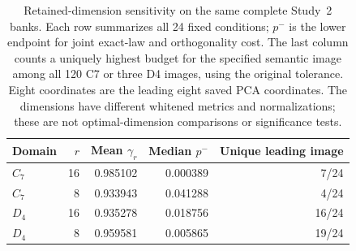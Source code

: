 \begin{table}[t]
\caption{Retained-dimension sensitivity on the same complete Study~2 banks. Each row summarizes all 24 fixed conditions; $p^-$ is the lower endpoint for joint exact-law and orthogonality cost. The last column counts a uniquely highest budget for the specified semantic image among all 120 C7 or three D4 images, using the original tolerance. Eight coordinates are the leading eight saved PCA coordinates. The dimensions have different whitened metrics and normalizations; these are not optimal-dimension comparisons or significance tests.}
\label{tab:sensitivity-main}
\centering\small
\setlength{\tabcolsep}{5pt}
\begin{tabular}{@{}lrrrr@{}}
\toprule
Domain & $r$ & Mean $\gamma_r$ & Median $p^-$ & Unique leading image \\
\midrule
$C_7$ & 16 & 0.985102 & 0.000389 & 7/24 \\
$C_7$ & 8 & 0.933943 & 0.041288 & 4/24 \\
\addlinespace
$D_4$ & 16 & 0.935278 & 0.018756 & 16/24 \\
$D_4$ & 8 & 0.959581 & 0.005865 & 19/24 \\
\bottomrule
\end{tabular}
\end{table}
